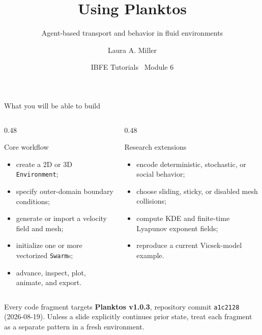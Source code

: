 \documentclass[aspectratio=169,11pt]{beamer}
\title[Using Planktos]{Using Planktos}
\subtitle{Agent-based transport and behavior in fluid environments}
\author[Miller]{Laura A. Miller}
\institute[UArizona]{Department of Mathematics, University of Arizona}
\date{IBFE Tutorials \textbullet\ Module 6}
\begin{document}
\begin{frame}[plain]
\end{frame}

\begin{frame}{What you will be able to build}
\begin{columns}[T,onlytextwidth]
\begin{column}{0.48\textwidth}
\begin{block}{Core workflow}
\begin{itemize}\itemsep2pt
  \item create a 2D or 3D \texttt{Environment};
  \item specify outer-domain boundary conditions;
  \item generate or import a velocity field and mesh;
  \item initialize one or more vectorized \texttt{Swarm}s;
  \item advance, inspect, plot, animate, and export.
\end{itemize}
\end{block}
\end{column}
\begin{column}{0.48\textwidth}
\begin{block}{Research extensions}
\begin{itemize}\itemsep4pt
  \item encode deterministic, stochastic, or social behavior;
  \item choose sliding, sticky, or disabled mesh collisions;
  \item compute KDE and finite-time Lyapunov exponent fields;
  \item reproduce a current Vicsek-model example.
\end{itemize}
\end{block}
\end{column}
\end{columns}
\begin{punchbox}
\footnotesize
\centering
Every code fragment targets \textbf{Planktos v1.0.3}, repository commit \texttt{a1c2128} (2026-08-19). Unless a slide explicitly continues prior state, treat each fragment as a separate pattern in a fresh environment.
\end{punchbox}
\end{frame}
\end{document}

